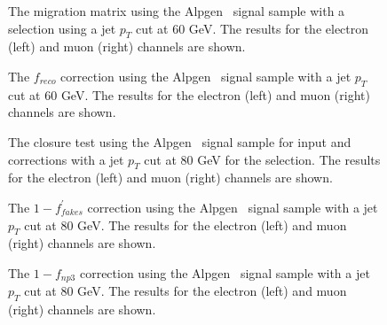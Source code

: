 \begin{figure}[htbp]
\centering
{}
\caption{The migration matrix using the Alpgen \ttbar\ signal sample with a selection using a jet $p_T$ cut at 60 GeV.  The results for the electron (left) and muon (right) channels are shown.}
\label{fig:MethodBmigration60}
\end{figure}

\begin{figure}[htbp]
\centering
{}
\caption{The $f_{reco}$ correction using the Alpgen \ttbar\ signal sample with a jet $p_T$ cut at 60 GeV.  The results for the electron (left) and muon (right) channels are shown.}
\label{fig:MethodBfreco60}
\end{figure}


\begin{sidewaysfigure}[htbp]
\centering
{}
\caption{The closure test using the Alpgen  \ttbar\ signal sample for input and corrections with a jet $p_T$
  cut at 80 GeV for the selection.  The
  results for the electron (left) and muon (right) channels are shown.}
\label{fig:MethodBclosure80}
\end{sidewaysfigure}

\begin{figure}[htbp]
\centering
{}
\caption{The $1 - f^{\prime}_{fakes}$ correction using the Alpgen \ttbar\ signal sample with a jet $p_T$ cut at 80 GeV.  The results for the electron (left) and muon (right) channels are shown.}
\label{fig:MethodBffakesp80}
\end{figure}


\begin{figure}[htbp]
\centering
{}
\caption{The $1 - f_{np3}$ correction using the Alpgen  \ttbar\ signal sample with a jet $p_T$ cut at 80 GeV.  The results for the electron (left) and muon (right) channels are shown.}
\label{fig:MethodBfnp380}
\end{figure}


